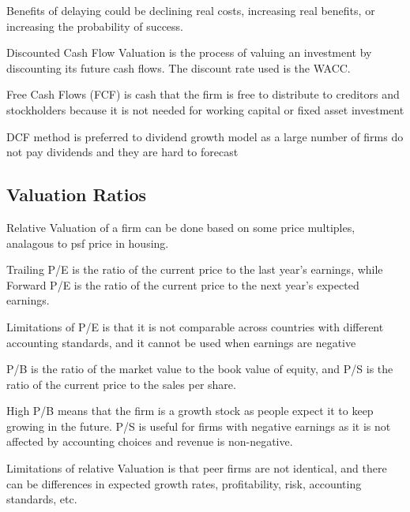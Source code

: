 Benefits of delaying could be declining real costs, increasing real benefits, or increasing the probability of success.


Discounted Cash Flow Valuation is the process of valuing an investment by discounting its future cash flows. The discount rate used is the WACC.

Free Cash Flows (FCF) is cash that the firm is free to distribute to creditors and stockholders because it is not needed for working capital or fixed asset investment

DCF method is preferred to dividend growth model as a large number of firms do not pay dividends and they are hard to forecast

\subsection{Valuation Ratios}
Relative Valuation of a firm can be done based on some price multiples, analagous to psf price in housing.

Trailing P/E is the ratio of the current price to the last year's earnings, while Forward P/E is the ratio of the current price to the next year's expected earnings.

Limitations of P/E is that it is not comparable across countries with different accounting standards, and it cannot be used when earnings are negative

P/B is the ratio of the market value to the book value of equity, and P/S is the ratio of the current price to the sales per share.

High P/B means that the firm is a growth stock as people expect it to keep growing in the future. P/S is useful 
for firms with negative earnings as it is not affected by accounting choices and revenue is non-negative.

Limitations of relative Valuation is that peer firms are not identical, and there can be differences in expected growth rates,
profitability, risk, accounting standards, etc.

